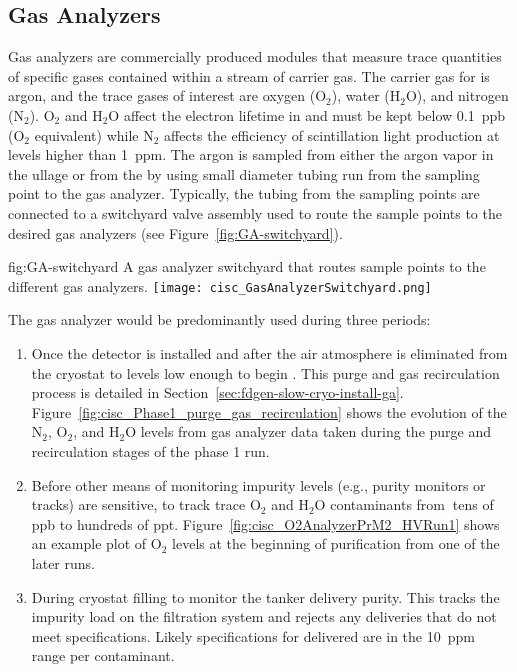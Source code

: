 \subsection{Gas Analyzers}
\label{sec:fdgen-slow-cryo-gas-anlyz}
 Gas analyzers are commercially produced modules that measure trace quantities of specific gases contained within a stream of carrier gas. The carrier gas for  is argon, and the trace gases of interest are oxygen ($\text{O}_2$), water ($\text{H}_2\text{O}$), and nitrogen ($\text{N}_2$). $\text{O}_2$ and $\text{H}_2\text{O}$ affect the electron lifetime in  and must be kept below \SI{0.1}{ppb} ($\text{O}_2$ equivalent) while $\text{N}_2$ affects the efficiency of scintillation light production at levels higher than \SI{1}{ppm}.
The argon is sampled from either the argon vapor in the ullage or from the  by using small diameter tubing run from the sampling point to the gas analyzer. Typically, the tubing from the sampling points are connected to a switchyard valve assembly used to route the sample points to the desired gas analyzers (see Figure~\ref{fig:GA-switchyard}).


\begin{dunefigure}{fig:GA-switchyard}
  {A gas analyzer switchyard that routes sample points to the different gas analyzers.}
  \texttt{[image: cisc\_GasAnalyzerSwitchyard.png]}
\end{dunefigure}

The gas analyzer would be predominantly used during three periods: 


\begin{enumerate}
\item Once the detector is installed and after the air atmosphere is eliminated from the cryostat to levels low enough to begin \cooldown. This purge and gas recirculation process is detailed in Section~\ref{sec:fdgen-slow-cryo-install-ga}. Figure~\ref{fig:cisc_Phase1_purge_gas_recirculation} shows the evolution of the $\text{N}_2$, $\text{O}_2$, and $\text{H}_2\text{O}$ levels from gas analyzer data taken during the purge and recirculation stages of the   %
phase 1 run.


\item Before other means of monitoring impurity levels (e.g., purity monitors or  tracks) are sensitive, to track trace $\text{O}_2$ and $\text{H}_2\text{O}$ contaminants from $\>$tens of ppb to hundreds of ppt.  Figure~\ref{fig:cisc_O2AnalyzerPrM2_HVRun1} shows an example plot of $\text{O}_2$ levels at the beginning of \lar purification from one of the later   runs.

\item During cryostat filling to monitor the tanker \lar delivery purity. This tracks the impurity load on the filtration system and rejects any deliveries that do not meet specifications. Likely specifications for delivered \lar are in the \SI{10}{ppm} range per contaminant.


\end{enumerate}

